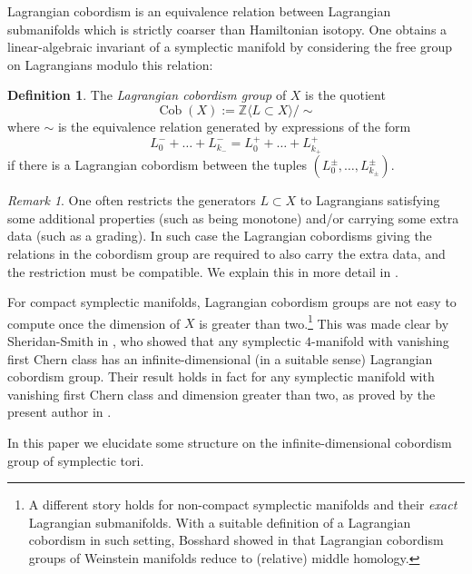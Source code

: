 \documentclass[10pt]{amsart}
\theoremstyle{definition}
\newtheorem{defn}[thm]{Definition}
\theoremstyle{remark}
\newtheorem{remark}[thm]{Remark}
\def\Z{\mathbb{Z}}
\DeclareMathOperator{\Cob}{Cob}
\newcommand{\vspan}[1]{\langle #1 \rangle}
\begin{document}
Lagrangian cobordism is an equivalence relation between Lagrangian submanifolds which is strictly coarser than Hamiltonian isotopy.
One obtains a linear-algebraic invariant of a symplectic manifold by considering the free group on Lagrangians modulo this relation:

\begin{defn}\label{def:cobsimple}
    The \emph{Lagrangian cobordism group} of $X$ is the quotient
    \begin{equation*}
        \Cob(X) := \Z\vspan{L \subset X} / \sim
    \end{equation*}
    where $\sim$ is the equivalence relation generated by expressions of the form
    \begin{equation*}
        L_0^- + \dots + L_{k_-}^- = L_0^+ + \dots + L_{k_+}^+
    \end{equation*}
    if there is a Lagrangian cobordism between the tuples $(L_0^\pm,\dots, L_{k_\pm}^\pm)$.
\end{defn}

\begin{remark}\label{rmk:decorations_cob}
    One often restricts the generators $L\subset X$ to Lagrangians satisfying some additional properties (such as being monotone) and/or carrying some extra data (such as a grading).
    In such case the Lagrangian cobordisms giving the relations in the cobordism group are required to also carry the extra data, and the restriction must be compatible. 
    We explain this in more detail in .
\end{remark}

For compact symplectic manifolds, Lagrangian cobordism groups are not easy to compute once the dimension  of $X$ is greater than two.\footnote{A different story holds for non-compact symplectic manifolds and their \emph{exact} Lagrangian submanifolds. With a suitable definition of a Lagrangian cobordism in such setting, Bosshard showed in \cite{bosshard2023note} that Lagrangian cobordism groups of Weinstein manifolds reduce to (relative) middle homology.}
This was made clear by Sheridan-Smith in \cite{sheridan2020rational}, who showed that any symplectic $4$-manifold with vanishing first Chern class has an infinite-dimensional (in a suitable sense) Lagrangian cobordism group.
Their result holds in fact for any symplectic manifold with vanishing first Chern class and dimension greater than two, as proved by the present author in \cite[Proposition 1.6]{muniz2024lagrangian}.

In this paper we elucidate some structure on the infinite-dimensional cobordism group of symplectic tori.
\end{document}

